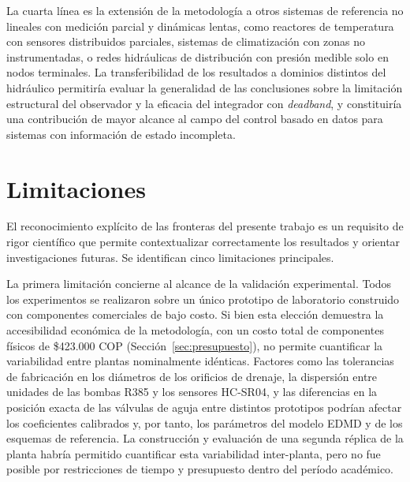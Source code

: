 \documentclass[12pt,letterpaper]{article}
\begin{document}
La cuarta línea es la extensión de la metodología a otros
sistemas de referencia no lineales con medición parcial y
dinámicas lentas, como reactores de temperatura con 
sensores distribuidos parciales, sistemas de climatización 
con zonas no instrumentadas, o redes hidráulicas de 
distribución con presión medible solo en nodos terminales. 
La transferibilidad de los resultados a dominios distintos 
del hidráulico permitiría evaluar la generalidad de las 
conclusiones sobre la limitación estructural del observador 
y la eficacia del integrador con \textit{deadband}, y 
constituiría una contribución de mayor alcance al campo 
del control basado en datos para sistemas con información 
de estado incompleta.
\section{Limitaciones}
\label{sec:limitaciones}

El reconocimiento explícito de las fronteras del presente 
trabajo es un requisito de rigor científico que permite 
contextualizar correctamente los resultados y orientar 
investigaciones futuras. Se identifican cinco limitaciones 
principales.

La primera limitación concierne al alcance de la validación 
experimental. Todos los experimentos se realizaron sobre un 
único prototipo de laboratorio construido con componentes 
comerciales de bajo costo. Si bien esta elección demuestra la 
accesibilidad económica de la metodología, con un costo total
de componentes físicos de \$423.000 COP (Sección~\ref{sec:presupuesto}), no
permite cuantificar la variabilidad entre plantas nominalmente
idénticas. Factores como las tolerancias de fabricación en los 
diámetros de los orificios de drenaje, la dispersión entre 
unidades de las bombas R385 y los sensores HC-SR04, y las 
diferencias en la posición exacta de las válvulas de aguja 
entre distintos prototipos podrían afectar los coeficientes 
calibrados y, por tanto, los parámetros del modelo EDMD y 
de los esquemas de referencia. La construcción y evaluación 
de una segunda réplica de la planta habría permitido 
cuantificar esta variabilidad inter-planta, pero no fue 
posible por restricciones de tiempo y presupuesto dentro 
del período académico.
\end{document}
